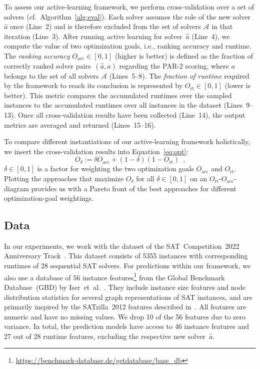 \documentclass[sn-basic, Numbered]{sn-jnl} %
\begin{document}
To assess our active-learning framework, we perform cross-validation over a set of solvers (cf.~Algorithm~\ref{alg:eval}).
Each solver assumes the role of the new solver~$\hat{a}$ once (Line~2) and is therefore excluded from the set of solvers $\mathcal{A}$ in that iteration (Line~3).
After running active learning for solver~$\hat{a}$ (Line~4), we compute the value of two optimization goals, i.e., ranking accuracy and runtime.
The \emph{ranking accuracy} $O_{\operatorname{acc}} \in \left[0, 1\right]$ (higher is better) is defined as the fraction of correctly ranked solver pairs~$\left(\hat{a}, a\right)$ regarding the PAR-2 scoring, where $a$ belongs to the set of all solvers $\mathcal{A}$ (Lines~5--8).
The \emph{fraction of runtime} required by the framework to reach its conclusion is represented by $O_{\operatorname{rt}} \in [0, 1]$ (lower is better).
This metric compares the accumulated runtimes over the sampled instances to the accumulated runtimes over all instances in the dataset (Lines~9--13).
Once all cross-validation results have been collected (Line~14), the output metrics are averaged and returned (Lines~15--16).

To compare different instantiations of our active-learning framework holistically, we insert the cross-validation results into Equation~\eqref{eq:opt}:
%
\begin{equation}
	O_\delta := \delta O_{\operatorname{acc}} + \left(1 - \delta\right) \left(1 - O_{\operatorname{rt}}\right) \enspace \textrm{,}
	\label{eq:opt}
\end{equation} 
%
$\delta \in \left[0, 1\right]$ is a factor for weighting the two optimization goals $O_{\operatorname{acc}}$ and $O_{\operatorname{rt}}$.
Plotting the approaches that maximize $O_\delta$ for all $\delta \in \left[0, 1\right]$ on an $O_{\operatorname{rt}}$-$O_{\operatorname{acc}}$-diagram provides us with a Pareto front of the best approaches for different optimization-goal weightings.

\subsection{Data}
\label{sec:exdesign:data}

In our experiments, we work with the dataset of the SAT~Competition~2022 Anniversary Track~\cite{sat2022}.
This dataset consists of 5355 instances with corresponding runtimes of 28 sequential SAT solvers.
For predictions within our framework, we also use a database of 56 instance features\footnote{\url{https://benchmark-database.de/getdatabase/base_db}} from the Global Benchmark Database~(GBD) by Iser~et~al.~\cite{IserS18}.
They include instance size features and node distribution statistics for several graph representations of SAT instances, and are primarily inspired by the SATzilla~2012 features described in~\cite{features}.
All features are numeric and have no missing values.
We drop 10 of the 56 features due to zero variance.
In total, the prediction models have access to 46 instance features and 27 out of 28 runtime features, excluding the respective new solver~$\hat{a}$.
\end{document}
